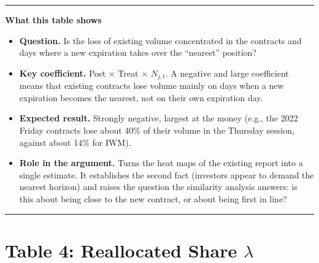 \documentclass[11pt]{article}
\newenvironment{tableshows}
  {\begin{center}\begin{minipage}{0.95\textwidth}\small
   \hrule\vspace{4pt}
   \textbf{What this table shows}\par
   \begin{itemize}[leftmargin=12pt,topsep=4pt,itemsep=4pt,parsep=0pt]}
  {\end{itemize}\vspace{2pt}\hrule\end{minipage}\end{center}}
\begin{document}
\begin{tableshows}
\item \textbf{Question.} Is the loss of existing volume concentrated in the contracts and days where a new expiration takes over the ``nearest'' position?
\item \textbf{Key coefficient.} Post $\times$ Treat $\times$ $N_{j,t}$. A negative and large coefficient means that existing contracts lose volume mainly on days when a new expiration becomes the nearest, not on their own expiration day.
\item \textbf{Expected result.} Strongly negative, largest at the money (e.g., the 2022 Friday contracts lose about 40\% of their volume in the Thursday session, against about 14\% for IWM).
\item \textbf{Role in the argument.} Turns the heat maps of the existing report into a single estimate. It establishes the second fact (investors appear to demand the nearest horizon) and raises the question the similarity analysis answers: is this about being close to the new contract, or about being first in line?
\end{tableshows}

\clearpage
\section*{Table 4: Reallocated Share $\lambda$}
\end{document}
